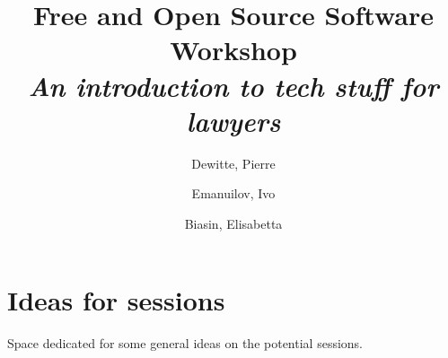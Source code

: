 \documentclass[12pt, a4paper]{article}
\title{Free and Open Source Software Workshop\\\large\textit{An introduction to tech stuff for lawyers}}
\author{Dewitte, Pierre \and Emanuilov, Ivo \and Biasin, Elisabetta}
\begin{document}
\maketitle

\section{Ideas for sessions}

Space dedicated for some general ideas on the potential sessions.
\end{document}
